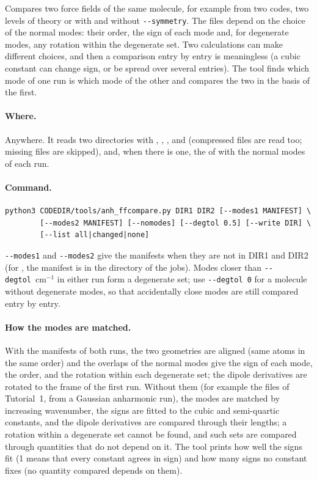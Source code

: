 Compares two force fields of the same molecule, for example from two
codes, two levels of theory or  with and without
\texttt{-{}-symmetry}. The files depend on the choice of the normal
modes: their order, the sign of each mode and, for degenerate modes, any
rotation within the degenerate set. Two calculations can make different
choices, and then a comparison entry by entry is meaningless (a cubic
constant can change sign, or be spread over several entries). The tool
finds which mode of one run is which mode of the other and compares the
two in the basis of the first.

\paragraph{Where.} Anywhere. It reads two directories with
, , ,  and
 (compressed  files are read too; missing files
are skipped), and, when there is one, the  of
 with the normal modes of each run.

\paragraph{Command.}
\begin{lstlisting}
python3 CODEDIR/tools/anh_ffcompare.py DIR1 DIR2 [--modes1 MANIFEST] \
        [--modes2 MANIFEST] [--nomodes] [--degtol 0.5] [--write DIR] \
        [--list all|changed|none]
\end{lstlisting}
\texttt{-{}-modes1} and \texttt{-{}-modes2} give the manifests when they
are not in DIR1 and DIR2 (for , the manifest is in the
directory of the jobs). Modes closer than \texttt{-{}-degtol}~cm$^{-1}$
in either run form a degenerate set; use \texttt{-{}-degtol 0} for a
molecule without degenerate modes, so that accidentally close modes are
still compared entry by entry.

\paragraph{How the modes are matched.} With the manifests of both runs,
the two geometries are aligned (same atoms in the same order) and the
overlaps of the normal modes give the sign of each mode, the order, and
the rotation within each degenerate set; the dipole derivatives are
rotated to the frame of the first run. Without them (for example the
files of Tutorial~1, from a Gaussian anharmonic run), the modes are
matched by increasing wavenumber, the signs are fitted to the cubic and
semi-quartic constants, and the dipole derivatives are compared through
their lengths; a rotation within a degenerate set cannot be found, and
such sets are compared through quantities that do not depend on it. The
tool prints how well the signs fit (1 means that every constant agrees
in sign) and how many signs no constant fixes (no quantity compared
depends on them).

